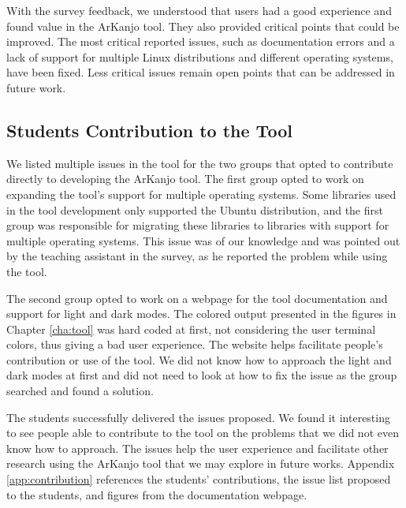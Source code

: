 With the survey feedback, we understood that users had a good experience and found value in the 
ArKanjo tool. They also provided critical points that could be improved. The most critical 
reported issues, such as documentation errors and a lack of support for multiple Linux distributions 
and different operating systems, have been fixed. Less critical issues remain open points that 
can be addressed in future work.

\subsection{Students Contribution to the Tool}

We listed multiple issues in the tool for the two groups that opted to contribute directly 
to developing the ArKanjo tool. The first group opted to work on expanding the tool's support 
for multiple operating systems. Some libraries used in the tool development only supported the 
Ubuntu distribution, and the first group was responsible for migrating these libraries to 
libraries with support for multiple operating systems. This issue was of our knowledge and 
was pointed out by the teaching assistant in the survey, as he reported the problem while 
using the tool.

The second group opted to work on a webpage for the tool documentation and support for 
light and dark modes. The colored output presented in the figures in Chapter \ref{cha:tool} was 
hard coded at first, not considering the user terminal colors, thus giving a bad user experience. 
The website helps facilitate people's contribution or use of the tool. We did not know how to 
approach the light and dark modes at first and did not need to look at how to fix the issue as 
the group searched and found a solution.

The students successfully delivered the issues proposed. We found it interesting to see 
people able to contribute to the tool on the problems that we did not even know how to approach.
The issues help the user experience and facilitate other research using the ArKanjo tool that 
we may explore in future works. Appendix \ref{app:contribution} references the 
students' contributions, the issue list proposed to the students, and figures from 
the documentation webpage.
